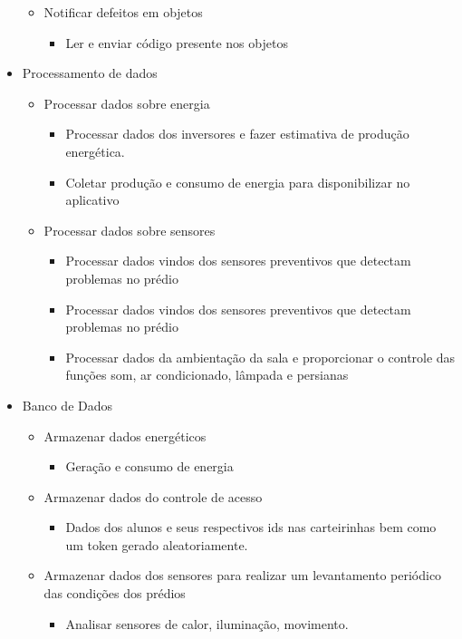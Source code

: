 \begin{apendicesenv}
\begin{itemize}
\begin{itemize}
        \item Notificar defeitos em objetos
        \begin{itemize}
        \item Ler e enviar código presente nos objetos
      \end{itemize}
      \end{itemize}
     \item Processamento de dados
     \begin{itemize}
        \item Processar dados sobre energia
        \begin{itemize}
        \item Processar dados dos inversores e fazer estimativa de produção energética.
        \item Coletar produção e consumo de energia para disponibilizar no aplicativo
        \end{itemize}
        \item Processar dados sobre sensores
        \begin{itemize}
        \item Processar dados vindos dos sensores preventivos que detectam problemas no prédio
        \item Processar dados vindos dos sensores preventivos que detectam problemas no prédio
        \item Processar dados da ambientação da sala e proporcionar o controle das funções som, ar condicionado, lâmpada e persianas
        \end{itemize}
      \end{itemize}
     \item Banco de Dados
          \begin{itemize}
        \item Armazenar dados energéticos
        \begin{itemize}
        \item Geração e consumo de energia
      \end{itemize}
        \item Armazenar dados do controle de acesso
        \begin{itemize}
        \item Dados dos alunos e seus respectivos ids nas carteirinhas bem como um token gerado aleatoriamente.
        \end{itemize}
        \item Armazenar dados dos sensores para realizar um levantamento periódico das condições dos prédios
        \begin{itemize}
        \item Analisar sensores de calor, iluminação, movimento.
        \end{itemize}


\end{itemize}
\end{itemize}
\end{apendicesenv}
